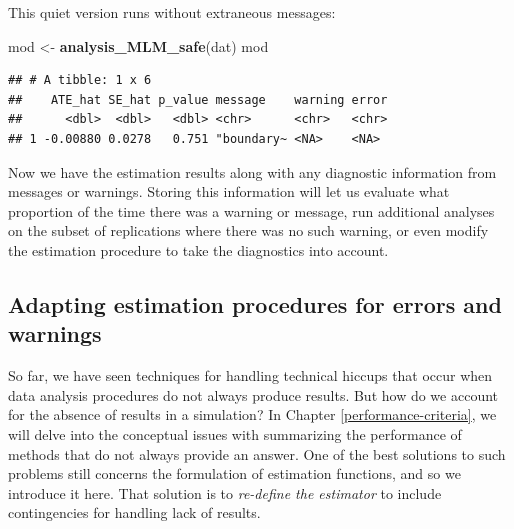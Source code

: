 \documentclass[
]{book}
\newenvironment{Shaded}{\begin{snugshade}}{\end{snugshade}}
\newcommand{\AttributeTok}[1]{\textcolor[rgb]{0.13,0.29,0.53}{#1}}
\newcommand{\FunctionTok}[1]{\textcolor[rgb]{0.13,0.29,0.53}{\textbf{#1}}}
\newcommand{\NormalTok}[1]{#1}
\newcommand{\OtherTok}[1]{\textcolor[rgb]{0.56,0.35,0.01}{#1}}
\newcommand{\SpecialCharTok}[1]{\textcolor[rgb]{0.81,0.36,0.00}{\textbf{#1}}}
\newcommand{\StringTok}[1]{\textcolor[rgb]{0.31,0.60,0.02}{#1}}
\begin{document}
\begin{Shaded}
\end{Shaded}

This quiet version runs without extraneous messages:

\begin{Shaded}
\begin{Highlighting}[]
\NormalTok{mod }\OtherTok{\textless{}{-}} \FunctionTok{analysis\_MLM\_safe}\NormalTok{(dat)}
\NormalTok{mod}
\end{Highlighting}
\end{Shaded}

\begin{verbatim}
## # A tibble: 1 x 6
##    ATE_hat SE_hat p_value message    warning error
##      <dbl>  <dbl>   <dbl> <chr>      <chr>   <chr>
## 1 -0.00880 0.0278   0.751 "boundary~ <NA>    <NA>
\end{verbatim}

Now we have the estimation results along with any diagnostic information from messages or warnings.
Storing this information will let us evaluate what proportion of the time there was a warning or message, run additional analyses on the subset of replications where there was no such warning, or even modify the estimation procedure to take the diagnostics into account.

\subsection{Adapting estimation procedures for errors and warnings}\label{adapting-for-errors}

So far, we have seen techniques for handling technical hiccups that occur when data analysis procedures do not always produce results.
But how do we account for the absence of results in a simulation?
In Chapter \ref{performance-criteria}, we will delve into the conceptual issues with summarizing the performance of methods that do not always provide an answer.
One of the best solutions to such problems still concerns the formulation of estimation functions, and so we introduce it here.
That solution is to \emph{re-define the estimator} to include contingencies for handling lack of results.
\end{document}
